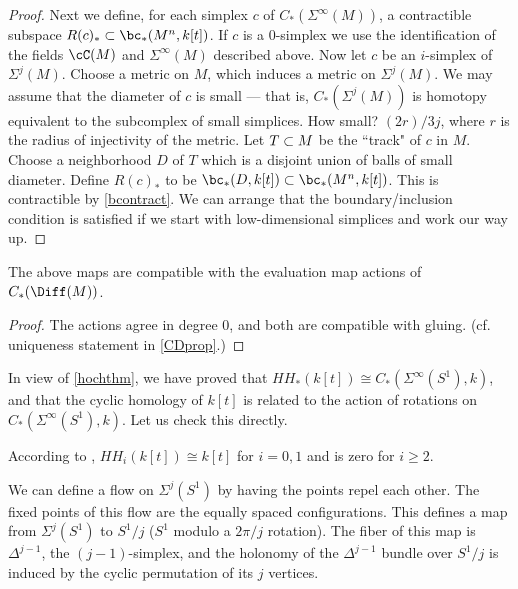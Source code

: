 \documentclass[11pt,leqno]{amsart}
\begin{document}
\begin{proof}
Next we define, for each simplex $c$ of $C_*(\Sigma^\infty(M))$, a contractible subspace
$R(c)_* \sub \bc_*(M^n, k[t])$.
If $c$ is a 0-simplex we use the identification of the fields $\cC(M)$ and 
$\Sigma^\infty(M)$ described above.
Now let $c$ be an $i$-simplex of $\Sigma^j(M)$.
Choose a metric on $M$, which induces a metric on $\Sigma^j(M)$.
We may assume that the diameter of $c$ is small --- that is, $C_*(\Sigma^j(M))$
is homotopy equivalent to the subcomplex of small simplices.
How small?  $(2r)/3j$, where $r$ is the radius of injectivity of the metric.
Let $T\subset M$ be the ``track" of $c$ in $M$.
Choose a neighborhood $D$ of $T$ which is a disjoint union of balls of small diameter.
Define $R(c)_*$ to be $\bc_*(D, k[t]) \sub \bc_*(M^n, k[t])$.
This is contractible by \ref{bcontract}.
We can arrange that the boundary/inclusion condition is satisfied if we start with
low-dimensional simplices and work our way up.

\end{proof}


\begin{prop} \label{ktcdprop}
The above maps are compatible with the evaluation map actions of $C_*(\Diff(M))$.
\end{prop}

\begin{proof}
The actions agree in degree 0, and both are compatible with gluing.
(cf. uniqueness statement in \ref{CDprop}.)
\end{proof}

\medskip

In view of \ref{hochthm}, we have proved that $HH_*(k[t]) \cong C_*(\Sigma^\infty(S^1), k)$,
and that the cyclic homology of $k[t]$ is related to the action of rotations
on $C_*(\Sigma^\infty(S^1), k)$.
Let us check this directly.

According to , $HH_i(k[t]) \cong k[t]$ for $i=0,1$ and is zero for $i\ge 2$.

We can define a flow on $\Sigma^j(S^1)$ by having the points repel each other.
The fixed points of this flow are the equally spaced configurations.
This defines a map from $\Sigma^j(S^1)$ to $S^1/j$ ($S^1$ modulo a $2\pi/j$ rotation).
The fiber of this map is $\Delta^{j-1}$, the $(j-1)$-simplex, 
and the holonomy of the $\Delta^{j-1}$ bundle
over $S^1/j$ is induced by the cyclic permutation of its $j$ vertices.
\end{document}
